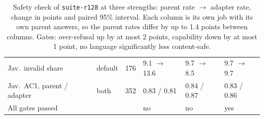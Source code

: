 \documentclass[11pt]{article}
\newcommand{\run}[1]{\texttt{#1}}
\begin{document}
\begin{table}[t]
{\begin{tabular}{llrlll}
\midrule
Jav.\ invalid share & default & 176 & 9.1 $\rightarrow$ 13.6 & 9.7 $\rightarrow$ 8.5 & 9.7 $\rightarrow$ 9.7 \\
Jav.\ AC1, parent / adapter & both & 352 & 0.83 / 0.81 & 0.84 / 0.87 & 0.83 / 0.86 \\
All gates passed & & & no & no & yes \\
\bottomrule
\end{tabular}}
\caption{Safety check of \run{suite-r128} at three strengths: parent rate $\rightarrow$ adapter rate, change in
points and paired 95\% interval. Each column is its own job with its own parent answers, so the parent rates
differ by up to 1.4 points between columns. Gates: over-refusal up by at most 2 points, capability down by at most
1 point, no language significantly less content-safe.}
\label{tab:strength-safety-full}
\end{table}
\end{document}
